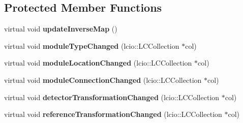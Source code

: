 \subsection*{Protected Member Functions}
\begin{DoxyCompactItemize}
\item 
virtual void {\bfseries updateInverseMap} ()\label{classCALICE_1_1BaseMappingIIProcessor_a60b39bae8ec80110e15b126c77138103}

\item 
virtual void {\bfseries moduleTypeChanged} (lcio::LCCollection $\ast$col)\label{classCALICE_1_1BaseMappingIIProcessor_a016f786152f13a2dbb7a0ca9c0727a08}

\item 
virtual void {\bfseries moduleLocationChanged} (lcio::LCCollection $\ast$col)\label{classCALICE_1_1BaseMappingIIProcessor_a9b65e70f55abef48ee724dab92c2b5db}

\item 
virtual void {\bfseries moduleConnectionChanged} (lcio::LCCollection $\ast$col)\label{classCALICE_1_1BaseMappingIIProcessor_a4ea22fa131cd52bdb59a9dc0d49bb033}

\item 
virtual void {\bfseries detectorTransformationChanged} (lcio::LCCollection $\ast$col)\label{classCALICE_1_1BaseMappingIIProcessor_ac82c048d8b7e3f28fe3b17b4855bb989}

\item 
virtual void {\bfseries referenceTransformationChanged} (lcio::LCCollection $\ast$col)\label{classCALICE_1_1BaseMappingIIProcessor_a5e17c0ecedbbb704f21f94091aeb61f0}

\end{DoxyCompactItemize}
